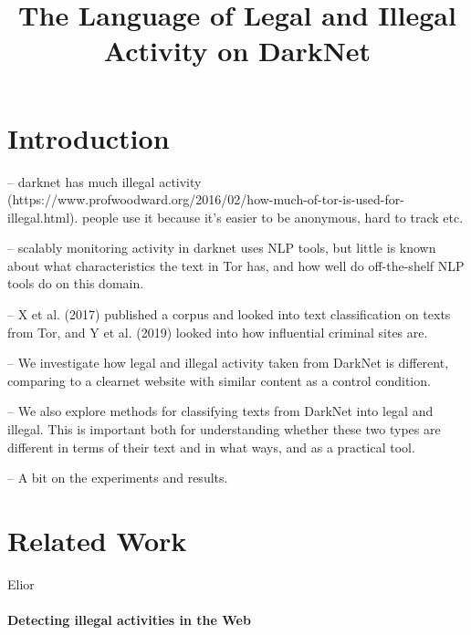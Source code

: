 \documentclass[11pt,a4paper]{article}
\title{The Language of Legal and Illegal Activity on DarkNet}
\date{}
\begin{document}
\maketitle
\begin{abstract}
  
\end{abstract}



\section{Introduction}

-- darknet has much illegal activity (https://www.profwoodward.org/2016/02/how-much-of-tor-is-used-for-illegal.html). people use it because it's easier to be anonymous, hard to track etc.

-- scalably monitoring activity in darknet uses NLP tools, but little is known about what characteristics the text in Tor has, and how well do off-the-shelf NLP tools do on this domain.

-- X et al. (2017) published a corpus and looked into text classification on texts from Tor, and Y et al. (2019) looked into how influential criminal sites are. 

-- We investigate how legal and illegal activity taken from DarkNet is different, comparing to a clearnet website with similar content as a control condition.

-- We also explore methods for classifying texts from DarkNet into legal and illegal. This is important both for understanding whether these two types are different in terms of
their text and in what ways, and as a practical tool.

-- A bit on the experiments and results.

\section{Related Work}

Elior

\paragraph{Detecting illegal activities in the Web}
\end{document}
